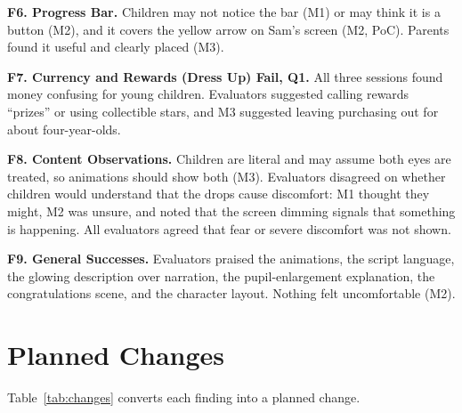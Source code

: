 \documentclass{article}
\newcommand{\fail}{{\textbf{Fail}}}
\newcommand{\crit}[1]{\textbf{Q#1}}
\begin{document}
\textbf{F6. Progress Bar.}
Children may not notice the bar (M1) or may think it is a button (M2), and it covers the yellow arrow on Sam's screen (M2, PoC). 
Parents found it useful and clearly placed (M3).

\textbf{F7. Currency and Rewards (Dress Up) \fail{}, \crit{1}.}
All three sessions found money confusing for young children. Evaluators suggested calling rewards ``prizes'' or using collectible 
stars, and M3 suggested leaving purchasing out for about four-year-olds.

\textbf{F8. Content Observations.}
Children are literal and may assume both eyes are treated, so animations should show both (M3). Evaluators disagreed on whether 
children would understand that the drops cause discomfort: M1 thought they might, M2 was unsure, and noted that the screen dimming 
signals that something is happening. All evaluators agreed that fear or severe discomfort was not shown.

\textbf{F9. General Successes.}
Evaluators praised the animations, the script language, the glowing description over narration, the pupil-enlargement explanation, 
the congratulations scene, and the character layout. Nothing felt uncomfortable (M2).

\section{Planned Changes}\label{sec:planned}

Table~\ref{tab:changes} converts each finding into a planned change.
\end{document}
